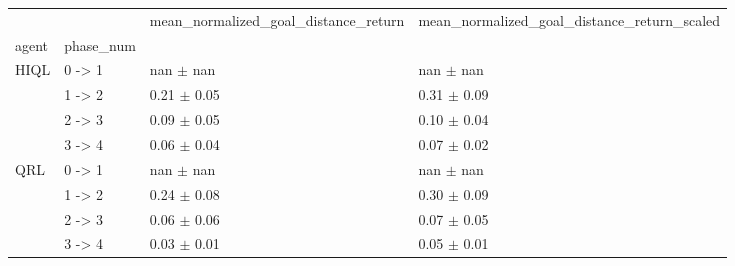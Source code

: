 \begin{tabular}{llll}
\toprule
 &  & mean_normalized_goal_distance_return & mean_normalized_goal_distance_return_scaled \\
agent & phase_num &  &  \\
\midrule
\multirow[t]{4}{*}{HIQL} & 0 -> 1 & nan $\pm$ nan & nan $\pm$ nan \\
 & 1 -> 2 & 0.21 $\pm$ 0.05 & 0.31 $\pm$ 0.09 \\
 & 2 -> 3 & 0.09 $\pm$ 0.05 & 0.10 $\pm$ 0.04 \\
 & 3 -> 4 & 0.06 $\pm$ 0.04 & 0.07 $\pm$ 0.02 \\
\cline{1-4}
\multirow[t]{4}{*}{QRL} & 0 -> 1 & nan $\pm$ nan & nan $\pm$ nan \\
 & 1 -> 2 & 0.24 $\pm$ 0.08 & 0.30 $\pm$ 0.09 \\
 & 2 -> 3 & 0.06 $\pm$ 0.06 & 0.07 $\pm$ 0.05 \\
 & 3 -> 4 & 0.03 $\pm$ 0.01 & 0.05 $\pm$ 0.01 \\
\cline{1-4}
\bottomrule
\end{tabular}
